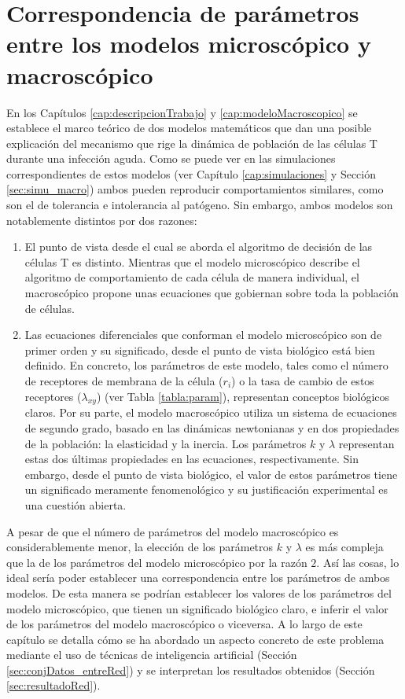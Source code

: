 \chapter{Correspondencia de parámetros entre los modelos microscópico y macroscópico}
\label{cap:redNeuronal}

En los Capítulos \ref{cap:descripcionTrabajo} y \ref{cap:modeloMacroscopico} se establece el marco teórico de dos modelos matemáticos que dan una posible explicación del mecanismo que rige la dinámica de población de las células T durante una infección aguda. Como se puede ver en las simulaciones correspondientes de estos modelos (ver Capítulo \ref{cap:simulaciones} y Sección \ref{sec:simu_macro}) ambos pueden reproducir comportamientos similares, como son el de tolerancia e intolerancia al patógeno. Sin embargo, ambos modelos son notablemente distintos por dos razones: 

\begin{enumerate}
	\item El punto de vista desde el cual se aborda el algoritmo de decisión de las células T es distinto. Mientras que el modelo microscópico describe el algoritmo de comportamiento de cada célula de manera individual, el macroscópico propone unas ecuaciones que gobiernan sobre toda la población de células. 
	
	\item Las ecuaciones diferenciales que conforman el modelo microscópico son de primer orden y su significado, desde el punto de vista biológico está bien definido. En concreto, los parámetros de este modelo, tales como el número de receptores de membrana de la célula ($r_{i}$) o la tasa de cambio de estos receptores ($\lambda_{xy}$) (ver Tabla \ref{tabla:param}), representan conceptos biológicos claros. Por su parte, el modelo macroscópico utiliza un sistema de ecuaciones de segundo grado, basado en las dinámicas newtonianas y en dos propiedades de la población: la elasticidad y la inercia. Los parámetros $k$ y $\lambda$ representan estas dos últimas propiedades en las ecuaciones, respectivamente. Sin embargo, desde el punto de vista biológico, el valor de estos parámetros tiene un significado meramente fenomenológico y su justificación experimental es una cuestión abierta.
	 
\end{enumerate}

A pesar de que el número de parámetros del modelo macroscópico es considerablemente menor, la elección de los parámetros $k$ y $\lambda$ es más compleja que la de los parámetros del modelo microscópico por la razón $2$. Así las cosas, lo ideal sería poder establecer una correspondencia entre los parámetros de ambos modelos. De esta manera se podrían establecer los valores de los parámetros del modelo microscópico, que tienen un significado biológico claro, e inferir el valor de los parámetros del modelo macroscópico o viceversa. A lo largo de este capítulo se detalla cómo se ha abordado un aspecto concreto de este problema mediante el uso de técnicas de inteligencia artificial (Sección \ref{sec:conjDatos_entreRed}) y se interpretan los resultados obtenidos (Sección \ref{sec:resultadoRed}). 



